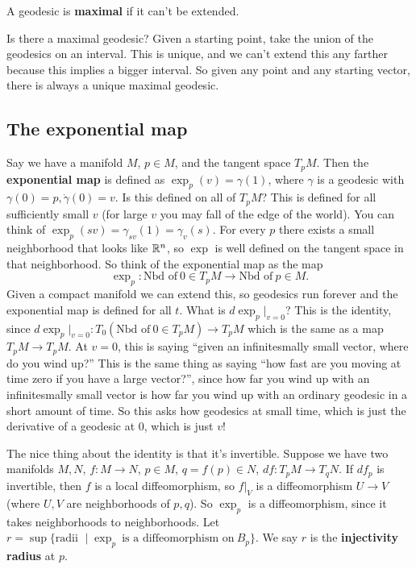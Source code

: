     \begin{definition}[]
        A geodesic is \textbf{maximal} if it can't be extended.
    \end{definition}
    Is there a maximal geodesic? Given a starting point, take the union of the geodesics on an interval. This is unique, and we can't extend this any farther because this implies a bigger interval. So given any point and any starting vector, there is always a unique maximal geodesic.

    \subsection{The exponential map}
    Say we have a manifold $M$, $p \in M$, and the tangent space $T_p M$. Then the \textbf{exponential map} is defined as $\exp_p(v)=\gamma (1)$, where $\gamma $ is a geodesic with $\gamma (0)=p,\dot \gamma (0)=v$. Is this defined on all of $T_p M$? This is defined for all sufficiently small $v$ (for large $v$ you may fall of the edge of the world). You can think of $\exp_p(sv)=\gamma _{sv}(1)=\gamma _v(s)$. For every $p$ there exists a small neighborhood that looks like $\mathbb{R}^n $, so $\exp$ is well defined on the tangent space in that neighborhood. So think of the exponential map as the map \[
    \exp_p \colon \text{Nbd of} \ 0 \in T_pM \to \text{Nbd of} \ p \in M.
\] Given a compact manifold we can extend this, so geodesics run forever and the exponential map is defined for all $t$. What is $d \exp_p|_{v=0}$? This is the identity, since $d \exp_p |_{v=0}\colon T_0(\text{Nbd of} \ 0 \in T_pM) \to T_pM$ which is the same as a map $T_p M\to T_p M$. At $v=0$, this is saying ``given an infinitesmally small vector, where do you wind up?'' This is the same thing as saying ``how fast are you moving at time zero if you have a large vector?'', since how far you wind up with an infinitesmally small vector is how far you wind up with an ordinary geodesic in a short amount of time. So this asks how geodesics at small time, which is just the derivative of a geodesic at 0, which is just $v$!

The nice thing about the identity is that it's invertible. Suppose we have two manifolds $M,N$, $f \colon M \to N$, $p \in M$, $q=f(p) \in N$, $df \colon T_p M \to T_qN$. If $df_p$ is invertible, then $f$ is a local diffeomorphism, so $f|_V$ is a diffeomorphism $U \to V$ (where $U,V$ are neighborhoods of $p,q$). So $\exp_p$ is a diffeomorphism, since it takes neighborhoods to neighborhoods. Let $r=\sup \{\text{radii } \mid \exp_p \ \text{is a diffeomorphism on} \ B_p\} $. We say $r$ is the \textbf{injectivity radius} at $p.$

